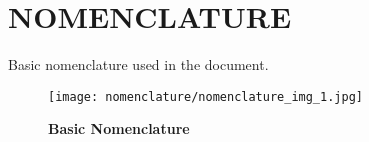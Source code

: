 \newpage
\thispagestyle{plain}
\section*{NOMENCLATURE}
    \label{sec:nomenclature}
\vspace*{1cm}

Basic nomenclature used in the document.\newline
\vspace*{2cm}

\begin{figure}[thpb]
    \centering
    \texttt{[image: nomenclature/nomenclature\_img\_1.jpg]}
    \caption[Basic Nomenclature]{\bf{Basic Nomenclature}}
	\label{fig:nomenclature}
\end{figure}